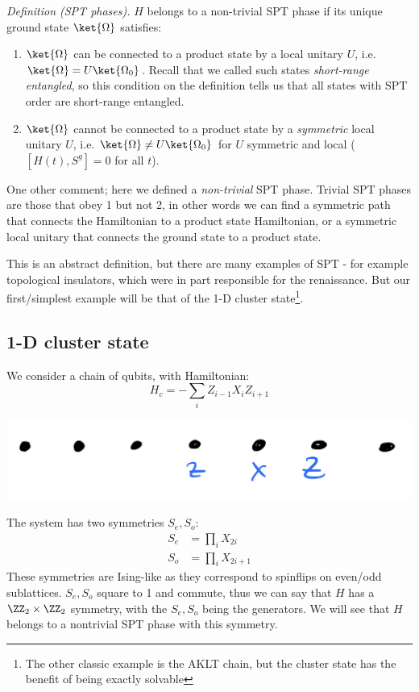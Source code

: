 \textit{Definition (SPT phases).} $H$ belongs to a non-trivial SPT phase if its unique ground state $\ket{\Omega}$ satisfies:
\begin{enumerate}
    \item $\ket{\Omega}$ can be connected to a product state by a local unitary $U$, i.e. $\ket{\Omega} = U\ket{\Omega_0}$. Recall that we called such states \emph{short-range entangled}, so this condition on the definition tells us that all states with SPT order are short-range entangled.
    \item $\ket{\Omega}$ cannot be connected to a product state by a \emph{symmetric} local unitary $U$, i.e. $\ket{\Omega} \neq U\ket{\Omega_0}$ for $U$ symmetric and local ($[H(t), S^g] = 0$ for all $t$).
\end{enumerate}

One other comment; here we defined a \emph{non-trivial} SPT phase. Trivial SPT phases are those that obey 1 but not 2, in other words we can find a symmetric path that connects the Hamiltonian to a product state Hamiltonian, or a symmetric local unitary that connects the ground state to a product state.

This is an abstract definition, but there are many examples of SPT - for example topological insulators, which were in part responsible for the renaissance. But our first/simplest example will be that of the 1-D cluster state\footnote{The other classic example is the AKLT chain, but the cluster state has the benefit of being exactly solvable}.

\subsection{1-D cluster state}
We consider a chain of qubits, with Hamiltonian:
\begin{equation}
    H_c = -\sum_i Z_{i-1}X_iZ_{i+1}
\end{equation}
\begin{center}
    \includegraphics[scale=0.35]{Lectures/Images/lec13-clusterchain.png}
\end{center}
The system has two symmetries $S_e, S_o$:
\begin{equation}
    \begin{split}
        S_e &= \prod_{i}X_{2i}
        \\ S_o &= \prod_{i}X_{2i+1}
    \end{split}
\end{equation}
These symmetries are Ising-like as they correspond to spinflips on even/odd sublattices. $S_e, S_o$ square to 1 and commute, thus we can say that $H$ has a $\ZZ_2 \times \ZZ_2$ symmetry, with the $S_e, S_o$ being the generators. We will see that $H$ belongs to a nontrivial SPT phase with this symmetry.

